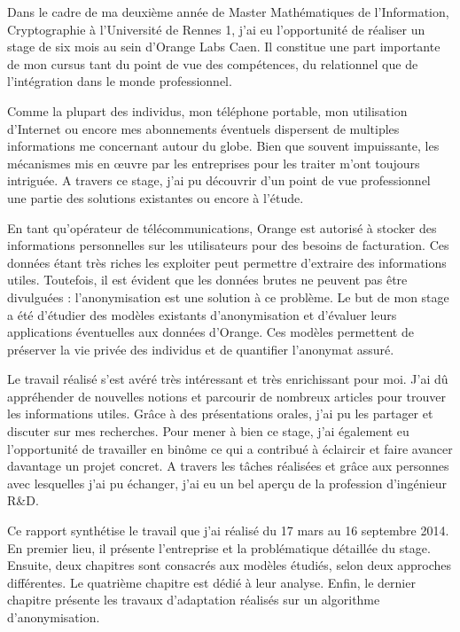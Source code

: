 \documentclass[11pt,oneside]{book}
\begin{document}
	Dans le cadre de ma deuxième année de Master Mathématiques de l'Information, Cryptographie à l'Université de Rennes 1, j'ai eu l'opportunité de réaliser un stage de six mois au sein d'Orange Labs Caen. Il constitue une part importante de mon cursus tant du point de vue des compétences, du relationnel que de l’intégration dans le monde professionnel.
	
	\bigskip
		
	Comme la plupart des individus, mon téléphone portable, mon utilisation d'Internet ou encore mes abonnements éventuels dispersent de multiples informations me concernant autour du globe. Bien que souvent impuissante, les mécanismes mis en \oe{}uvre par les entreprises pour les traiter m'ont toujours intriguée. A travers ce stage, j'ai pu découvrir d'un point de vue professionnel une partie des solutions existantes ou encore à l'étude.
	
	\bigskip
	
	En tant qu’opérateur de télécommunications, Orange est autorisé à stocker des informations personnelles sur les utilisateurs pour des besoins de facturation. Ces données étant très riches les exploiter peut permettre d'extraire des informations utiles. Toutefois, il est évident que les données brutes ne peuvent pas être divulguées : l'anonymisation est une solution à ce problème. Le but de mon stage a été d'étudier des modèles existants d'anonymisation et d'évaluer leurs applications éventuelles aux données d'Orange. Ces modèles permettent de préserver la vie privée des individus et de quantifier l'anonymat assuré. 
	
	\bigskip
	
	Le travail réalisé s’est avéré très intéressant et très enrichissant pour moi. J'ai dû appréhender de nouvelles notions et parcourir de nombreux articles pour trouver les informations utiles. Grâce à des présentations orales, j'ai pu les partager et discuter sur mes recherches. Pour mener à bien ce stage, j'ai également eu l'opportunité de travailler en binôme ce qui a contribué à éclaircir et faire avancer davantage un projet concret. A travers les tâches réalisées et grâce aux personnes avec lesquelles j'ai pu échanger, j'ai eu un bel aperçu de la profession d'ingénieur R\&D. 

	\bigskip	
	
	Ce rapport synthétise le travail que j'ai réalisé du 17 mars au 16 septembre 2014. En premier lieu, il présente l’entreprise et la problématique détaillée du stage. Ensuite, deux chapitres sont consacrés aux modèles étudiés, selon deux approches différentes. Le quatrième chapitre est dédié à leur analyse. Enfin, le dernier chapitre présente les travaux d'adaptation réalisés sur un algorithme d'anonymisation.
\end{document}
